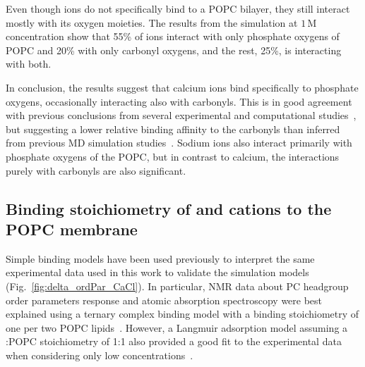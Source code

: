 \documentclass[aip,jcp,twocolumn]{revtex4}
\begin{document}
Even though  ions do not specifically bind to a POPC bilayer, they still interact mostly with its oxygen moieties. The results from the simulation at $1\,$M  concentration show that 55\% of  ions interact with only phosphate oxygens of POPC and 20\% with only carbonyl oxygens, and the rest, 25\%, is interacting with both.

In conclusion, the results suggest that calcium ions bind specifically to phosphate oxygens, occasionally interacting also with carbonyls. This is in good agreement with previous conclusions from several experimental and computational studies~\cite{hauser76, hauser78, herbette84, cevc90, binder02}, but suggesting a lower relative binding affinity to the carbonyls than inferred from previous MD simulation studies~\cite{bockmann03, bockmann04, melcrova16, javanainen17}. Sodium ions also interact primarily with phosphate oxygens of the POPC, but in contrast to calcium, the interactions purely with carbonyls are also significant.

\subsection{Binding stoichiometry of  and  cations to the POPC membrane}


Simple binding models have been used previously to interpret the same experimental data \cite{altenbach84,macdonald87} used in this work to validate the simulation models (Fig.~\ref{fig:delta_ordPar_CaCl}). In particular, NMR data about PC headgroup order parameters response and atomic absorption spectroscopy were best explained using a ternary complex binding model with a binding stoichiometry of one  per two POPC lipids~\cite{altenbach84}. However, a Langmuir adsorption model assuming a :POPC stoichiometry of 1:1 also provided a good fit to the experimental data when considering only low concentrations~\cite{macdonald87}.
\end{document}
